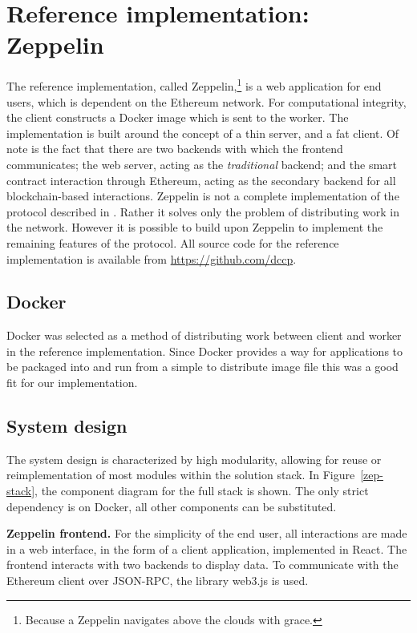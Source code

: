 \section{Reference implementation: Zeppelin}
The reference implementation, called Zeppelin,\footnote{Because a Zeppelin navigates above the clouds with grace.} is a web application for end users, which is dependent on the Ethereum network. For computational integrity, the client constructs a Docker image which is sent to the worker. The implementation is built around the concept of a thin server, and a fat client. Of note is the fact that there are two backends with which the frontend communicates; the web server, acting as the \textit{traditional} backend; and the smart contract interaction through Ethereum, acting as the secondary backend for all blockchain-based interactions. Zeppelin is not a complete implementation of the protocol described in . Rather it solves only the problem of distributing work in the network. However it is possible to build upon Zeppelin to implement the remaining features of the protocol.
All source code for the reference implementation is available from \href{https://github.com/dccp}{https://github.com/dccp}.

\subsection{Docker}
Docker was selected as a method of distributing work between client and worker in the reference implementation. Since Docker provides a way for applications to be packaged into and run from a simple to distribute image file this was a good fit for our implementation.

\subsection{System design}
The system design is characterized by high modularity, allowing for reuse or reimplementation of most modules within the solution stack. In Figure~\ref{zep-stack}, the component diagram for the full stack is shown. The only strict dependency is on Docker, all other components can be substituted.

\textbf{Zeppelin frontend.} For the simplicity of the end user, all interactions are made in a web interface, in the form of a client application, implemented in React. The frontend interacts with two backends to display data. To communicate with the Ethereum client over JSON-RPC, the library web3.js is used.

